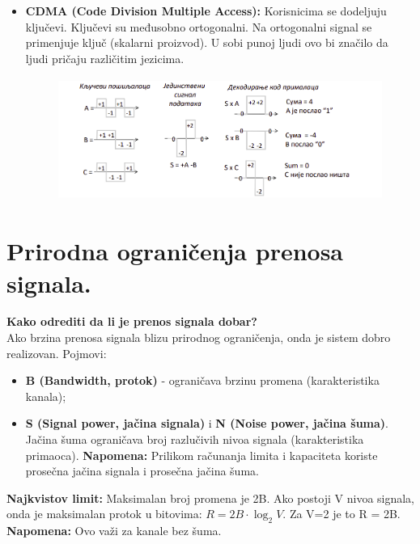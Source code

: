 \documentclass[a4paper]{article}
\begin{document}
\begin{itemize}
            \item \textbf{CDMA (Code Division Multiple Access):} Korisnicima se dodeljuju ključevi.
                  Ključevi su međusobno ortogonalni. Na ortogonalni signal se primenjuje ključ (skalarni
                  proizvod). U sobi punoj ljudi ovo bi značilo da ljudi pričaju različitim jezicima.
                  \begin{figure}[H]
                    \begin{center}
                        \includegraphics[width=120mm,height=40mm]{Slike/multipleksiranje.png}
                    \end{center}
                  \end{figure}
        \end{itemize}

\section{Prirodna ograničenja prenosa signala.}
    \textbf{Kako odrediti da li je prenos signala dobar?} \\
    Ako brzina prenosa signala blizu prirodnog ograničenja, onda je sistem dobro realizovan. Pojmovi:
    \begin{itemize}
        \item \textbf{B (Bandwidth, protok)} - ograničava brzinu promena (karakteristika kanala);
        \item \textbf{S (Signal power, jačina signala)} i \textbf{N (Noise power, jačina šuma)}. 
              Jačina šuma ograničava broj razlučivih nivoa signala (karakteristika primaoca).
              \textbf{Napomena:} Prilikom računanja limita i kapaciteta koriste prosečna jačina signala
              i prosečna jačina šuma.
    \end{itemize} 

    \textbf{Najkvistov limit:} Maksimalan broj promena je 2B. Ako postoji V nivoa signala, onda je
    maksimalan protok u bitovima: $R = 2B\cdot \log_2{V}$. Za V=2 je to R = 2B. \textbf{Napomena:}
    Ovo važi za kanale bez šuma.\\
\end{document}
